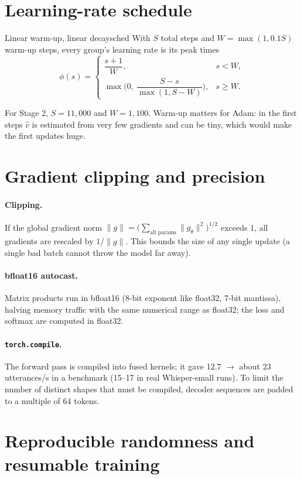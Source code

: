 \section{Learning-rate schedule}

\begin{definition}{Linear warm-up, linear decay}{sched}
With $S$ total steps and $W=\max(1,0.1S)$ warm-up steps, every group's learning rate is its peak times
\[
\phi(s)=\begin{cases}\dfrac{s+1}{W}, & s<W,\\[6pt] \max\!\Big(0,\ \dfrac{S-s}{\max(1,S-W)}\Big), & s\ge W.\end{cases}
\]
\end{definition}
For Stage 2, $S=11{,}000$ and $W=1{,}100$. Warm-up matters for Adam: in the first steps $\hat v$ is estimated from very few gradients
and can be tiny, which would make the first updates huge.

\section{Gradient clipping and precision}

\paragraph{Clipping.} If the global gradient norm $\|g\|=\big(\sum_{\text{all params}}\|g_\theta\|^2\big)^{1/2}$ exceeds 1, all
gradients are rescaled by $1/\|g\|$. This bounds the size of any single update (a single bad batch cannot throw the model far away).

\paragraph{bfloat16 autocast.} Matrix products run in bfloat16 (8-bit exponent like float32, 7-bit mantissa), halving memory traffic
with the same numerical range as float32; the loss and softmax are computed in float32.

\paragraph{\texttt{torch.compile}.} The forward pass is compiled into fused kernels; it gave 12.7 $\to$ about 23 utterances/s in a
benchmark (15--17 in real Whisper-small runs). To limit the number of distinct shapes that must be compiled, decoder sequences are
padded to a multiple of 64 tokens.

\section{Reproducible randomness and resumable training}

